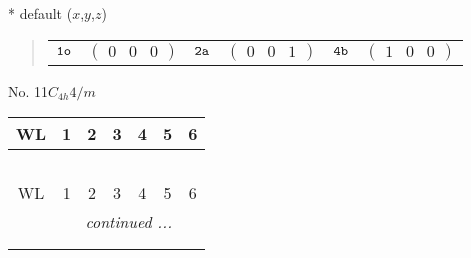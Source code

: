 \documentclass[fleqn,9pt,landscape]{jsarticle}
\begin{document}
* default ($x$,$y$,$z$)
\begin{quote}
\begin{tabular}{cccccc}
$ {\tt 1o} $ & $ \begin{pmatrix} 0 & 0 & 0 \end{pmatrix} $ & $ {\tt 2a} $ & $ \begin{pmatrix} 0 & 0 & 1 \end{pmatrix} $ & $ {\tt 4b} $ & $ \begin{pmatrix} 1 & 0 & 0 \end{pmatrix} $
\end{tabular}
\end{quote}
\newpage
No. 11\quad$C_{4h}$\quad$4/m$\quad[ tetragonal ]
\begin{center}
\renewcommand{\arraystretch}{1.2}
\begin{longtable}{ccccccc}
 \hline \hline
WL & 1 & 2 & 3 & 4 & 5 & 6 \\ \hline \endfirsthead

\multicolumn{6}{l}{\tablename\ \thetable{}} \\
 \hline \hline
WL & 1 & 2 & 3 & 4 & 5 & 6 \\ \hline \endhead

 \hline \hline
\multicolumn{6}{r}{\footnotesize\it continued ...} \\ \endfoot

 \hline \hline
\multicolumn{6}{r}{} \\ \endlastfoot


\end{longtable}
\end{center}
\end{document}
